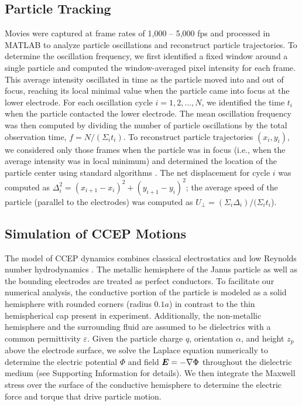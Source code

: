 \subsection{Particle Tracking}

Movies were captured at frame rates of 1,000 -- 5,000 fps and processed in MATLAB to analyze particle oscillations and reconstruct particle trajectories. 
To determine the oscillation frequency, we first identified a fixed window around a single particle and computed the window-averaged pixel intensity for each frame.
This average intensity oscillated in time as the particle moved into and out of focus, reaching its local minimal value when the particle came into focus at the lower electrode.
For each oscillation cycle $i=1,2,\dots, N$, we identified the time $t_i$ when the particle contacted the lower electrode. 
The mean oscillation frequency was then computed by dividing the number of particle oscillations by the total observation time, $f= N / (\Sigma_i t_i)$.
To reconstruct particle trajectories $(x_i,y_i)$, we considered only those frames when the particle was in focus (i.e., when the average intensity was in local minimum) and determined the location of the particle center using standard algorithms \autocite{Track}.
The net displacement for cycle $i$ was computed as $\Delta_i^2 = (x_{i+1} - x_i)^2 + (y_{i+1}-y_i)^2$; the average speed of the particle (parallel to the electrodes) was computed as $U_{\perp} = (\Sigma_i \Delta_i)  /  (\Sigma_i t_i$).

\subsection{Simulation of CCEP Motions}

The model of CCEP dynamics combines classical electrostatics and low Reynolds number hydrodynamics \autocite{drews2015contact}. 
The metallic hemisphere of the Janus particle as well as the bounding electrodes are treated as perfect conductors.
To facilitate our numerical analysis, the conductive portion of the particle is modeled as a solid hemisphere with rounded corners (radius $0.1a$) in contrast to the thin hemispherical cap present in experiment.
Additionally, the non-metallic hemisphere and the surrounding fluid are assumed to be dielectrics with a common permittivity $\varepsilon$.
Given the particle charge $q$, orientation $\alpha$, and height $z_p$ above the electrode surface, we solve the Laplace equation numerically to determine the electric potential $\Phi$ and field $\boldsymbol{E}=-\nabla \Phi$ throughout the dielectric medium (see Supporting Information for details).
We then integrate the Maxwell stress over the surface of the conductive hemisphere to determine the electric force and torque that drive particle motion.

